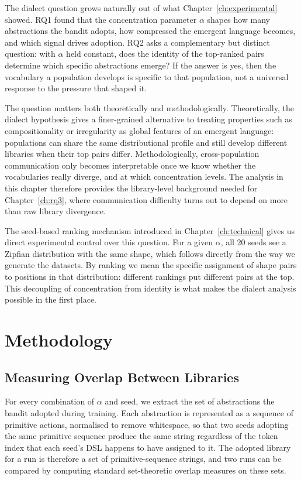The dialect question grows naturally out of what Chapter~\ref{ch:experimental} showed. RQ1 found that the concentration parameter $\alpha$ shapes how many abstractions the bandit adopts, how compressed the emergent language becomes, and which signal drives adoption. RQ2 asks a complementary but distinct question: with $\alpha$ held constant, does the identity of the top-ranked pairs determine which specific abstractions emerge? If the answer is yes, then the vocabulary a population develops is specific to that population, not a universal response to the pressure that shaped it.

The question matters both theoretically and methodologically. Theoretically, the dialect hypothesis gives a finer-grained alternative to treating properties such as compositionality or irregularity as global features of an emergent language: populations can share the same distributional profile and still develop different libraries when their top pairs differ. Methodologically, cross-population communication only becomes interpretable once we know whether the vocabularies really diverge, and at which concentration levels. The analysis in this chapter therefore provides the library-level background needed for Chapter~\ref{ch:rq3}, where communication difficulty turns out to depend on more than raw library divergence.

The seed-based ranking mechanism introduced in Chapter~\ref{ch:technical} gives us direct experimental control over this question. For a given $\alpha$, all 20 seeds see a Zipfian distribution with the same shape, which follows directly from the way we generate the datasets. By ranking we mean the specific assignment of shape pairs to positions in that distribution: different rankings put different pairs at the top. This decoupling of concentration from identity is what makes the dialect analysis possible in the first place.

\section{Methodology}
\label{sec:rq2-methodology}

\subsection{Measuring Overlap Between Libraries}
\label{sec:rq2-overlap}

For every combination of $\alpha$ and seed, we extract the set of abstractions the bandit adopted during training. Each abstraction is represented as a sequence of primitive actions, normalised to remove whitespace, so that two seeds adopting the same primitive sequence produce the same string regardless of the token index that each seed's DSL happens to have assigned to it. The adopted library for a run is therefore a set of primitive-sequence strings, and two runs can be compared by computing standard set-theoretic overlap measures on these sets.

